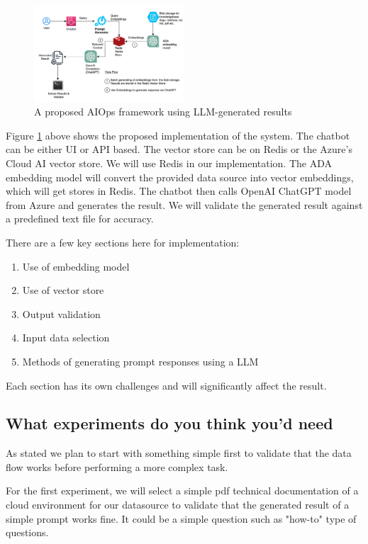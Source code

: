 \documentclass[conference]{IEEEtran}
\begin{document}
\begin{figure}[ht]
    \centering
    \includegraphics[width=0.5\textwidth]{arch.png}
    \caption{A proposed AIOps framework using LLM-generated results}
    \label{fig:arch}
\end{figure} 

Figure \ref{fig:arch} above shows the proposed implementation of the system. The chatbot can be either UI or API based. The vector store can be on Redis or the Azure's Cloud AI vector store. We will use Redis in our implementation. The ADA embedding model will convert the provided data source into vector embeddings, which will get stores in Redis. The chatbot then calls OpenAI ChatGPT model from Azure and generates the result. We will validate the generated result against a predefined text file for accuracy. 

There are a few key sections here for implementation: 
\begin{enumerate}
    \item Use of embedding model 
    \item Use of vector store 
    \item Output validation 
    \item Input data selection
    \item Methods of generating prompt responses using a LLM
\end{enumerate}

Each section has its own challenges and will significantly affect the result.


\subsection{What experiments do you think you'd need}
As stated we plan to start with something simple first to validate that the data flow works before performing a more complex task.

For the first experiment, we will select a simple pdf technical documentation of a cloud environment for our datasource to validate that the generated result of a simple prompt works fine. It could be a simple question such as "how-to" type of questions.
\end{document}
